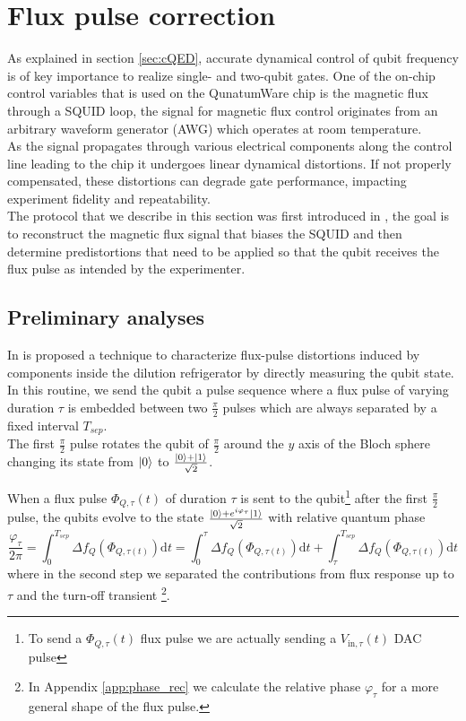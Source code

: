 \newpage
\restoregeometry

\section{Flux pulse correction}

As explained in section \ref{sec:cQED}, accurate dynamical control of qubit frequency is of key importance to realize single- and two-qubit gates.
One of the on-chip control variables that is used on the QunatumWare chip is the magnetic flux through a SQUID loop, the signal for magnetic flux control originates from an arbitrary waveform generator (AWG) which operates at room temperature.\\
As the signal propagates through various electrical components along the control line leading to the chip it undergoes linear dynamical distortions. 
If not properly compensated, these distortions can degrade gate performance, impacting experiment fidelity and repeatability.\\

The protocol that we describe in this section was first introduced in \cite{rol_time-domain_2020}, the goal is to reconstruct the magnetic flux signal that biases the SQUID and then determine predistortions that need to be applied so that the qubit receives the flux pulse as intended by the experimenter.

\subsection{Preliminary analyses}\label{subsec:preliminary}

In \cite{rol_time-domain_2020} is proposed a technique to characterize flux-pulse distortions induced by components inside the dilution refrigerator by directly measuring the qubit state.
In this routine, we send the qubit a pulse sequence where a flux pulse of varying duration $\tau$ is embedded between two $\frac{\pi}{2}$ pulses which are always separated by a fixed interval $T_{sep}$.\\
The first $\frac{\pi}{2}$ pulse rotates the qubit of $\frac{\pi}{2}$ around the $y$ axis of the Bloch sphere changing its state from $\ket{0}$ to $\frac{\ket{0}+\ket{1}}{\sqrt{2}}$.

When a flux pulse $\Phi_{Q,\tau}(t)$ of duration $\tau$ is sent to the qubit\footnote{To send a $\Phi_{Q,\tau}(t)$ flux pulse we are actually sending a $V_{\text{in},\tau}(t)$ DAC pulse} after the first $\frac{\pi}{2}$ pulse, the qubits evolve to the state $\frac{\ket{0}+e^{i\varphi_\tau}\ket{1}}{\sqrt{2}}$ with relative quantum phase 
\begin{equation}\label{eq:phi}
    \frac{\varphi_{\tau}}{2\pi} = \int_{0}^{T_{sep}} \Delta f_Q (\Phi_{Q,\tau(t)})\text{d}t = \int_{0}^{\tau} \Delta f_Q (\Phi_{Q,\tau(t)})\text{d}t + \int_{\tau}^{T_{sep}} \Delta f_Q (\Phi_{Q,\tau(t)})\text{d}t
\end{equation}
where in the second step we separated the contributions from flux response up to $\tau$ and the turn-off transient \footnote{In Appendix \ref{app:phase_rec} we calculate the relative phase $\varphi_{\tau}$ for a more general shape of the flux pulse.}. 

